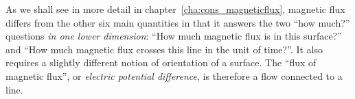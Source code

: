 \documentclass[a4paper,12pt,%
onecolumn,oneside,%
british%
]{memoir}
\renewcommand*{\|}[1][]{\nonscript\:#1\vert\nonscript\:\mathopen{}}
\newcommand*{\chap}{chapter}%
\begin{document}
As we shall see in more detail in \chap~\ref{cha:cons_magneticflux}, magnetic flux differs from the other six main quantities in that it answers the two \enquote{how much?} questions \emph{in one lower dimension}: \enquote{How much magnetic flux is in this surface?} and \enquote{How much magnetic flux crosses this line in the unit of time?}. It also requires a slightly different notion of orientation of a surface. The \enquote{flux of magnetic flux}, or \emph{electric potential difference}, is therefore a flow connected to a line.


\end{document}
